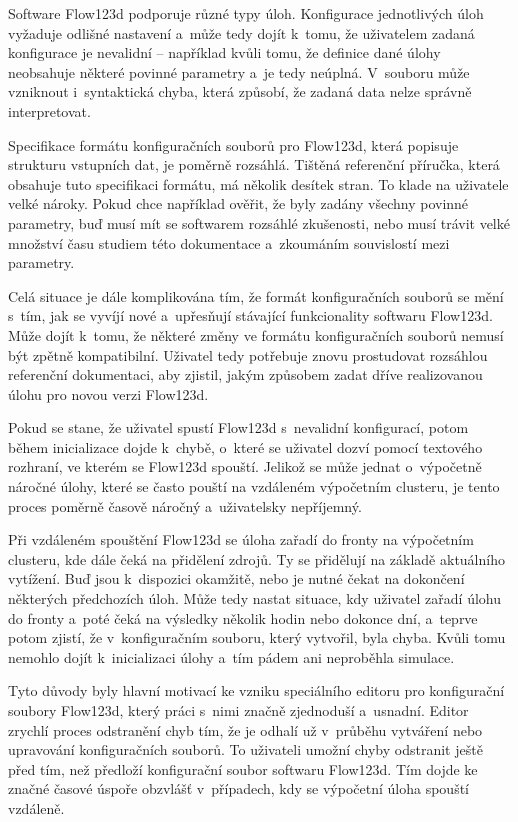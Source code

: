 \documentclass[FM,bw,DP]{tulthesis}
\begin{document}
Software Flow123d podporuje různé typy úloh. Konfigurace jednotlivých úloh vyžaduje odlišné nastavení a~může tedy dojít k~tomu, že uživatelem zadaná konfigurace je nevalidní -- například kvůli tomu, že definice dané úlohy neobsahuje některé povinné parametry a~je tedy neúplná. V~souboru může vzniknout i~syntaktická chyba, která způsobí, že zadaná data nelze správně interpretovat.

Specifikace formátu konfiguračních souborů pro Flow123d, která popisuje strukturu vstupních dat, je poměrně rozsáhlá. Tištěná referenční příručka, která obsahuje tuto specifikaci formátu, má několik desítek stran. To klade na uživatele velké nároky. Pokud chce například ověřit, že byly zadány všechny povinné parametry, buď musí mít se softwarem rozsáhlé zkušenosti, nebo musí trávit velké množství času studiem této dokumentace a~zkoumáním souvislostí mezi parametry.

Celá situace je dále komplikována tím, že formát konfiguračních souborů se mění s~tím, jak se vyvíjí nové a~upřesňují stávající funkcionality softwaru Flow123d. Může dojít k~tomu, že některé změny ve formátu konfiguračních souborů nemusí být zpětně kompatibilní. Uživatel tedy potřebuje znovu prostudovat rozsáhlou referenční dokumentaci, aby zjistil, jakým způsobem zadat dříve realizovanou úlohu pro novou verzi Flow123d.

Pokud se stane, že uživatel spustí Flow123d s~nevalidní konfigurací, potom během inicializace dojde k~chybě, o~které se uživatel dozví pomocí textového rozhraní, ve kterém se Flow123d spouští. Jelikož se může jednat o~výpočetně náročné úlohy, které se často pouští na vzdáleném výpočetním clusteru, je tento proces poměrně časově náročný a~uživatelsky nepříjemný.

Při vzdáleném spouštění Flow123d se úloha zařadí do fronty na výpočetním clusteru, kde dále čeká na přidělení zdrojů. Ty se přidělují na základě aktuálního vytížení. Buď jsou k~dispozici okamžitě, nebo je nutné čekat na dokončení některých předchozích úloh. Může tedy nastat situace, kdy uživatel zařadí úlohu do fronty a~poté čeká na výsledky několik hodin nebo dokonce dní, a~teprve potom zjistí, že v~konfiguračním souboru, který vytvořil, byla chyba. Kvůli tomu nemohlo dojít k~inicializaci úlohy a~tím pádem ani neproběhla simulace.

Tyto důvody byly hlavní motivací ke vzniku speciálního editoru pro konfigurační soubory Flow123d, který práci s~nimi značně zjednoduší a~usnadní. Editor zrychlí proces odstranění chyb tím, že je odhalí už v~průběhu vytváření nebo upravování konfiguračních souborů. To uživateli umožní chyby odstranit ještě před tím, než předloží konfigurační soubor softwaru Flow123d. Tím dojde ke značné časové úspoře obzvlášť v~případech, kdy se výpočetní úloha spouští vzdáleně.
\end{document}
